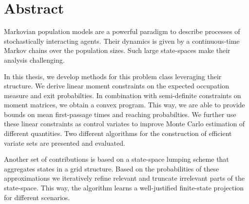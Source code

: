 
\chapter*{Abstract}
Markovian population models are a powerful paradigm to describe processes of stochastically interacting agents. Their dynamics is given by a continuous-time Markov chains over the population sizes. Such large state-spaces make their analysis challenging.

In this thesis, we develop methods for this problem class leveraging their structure. We derive linear moment constraints on the expected occupation measure and exit probabilties. In combination with semi-definite constraints on moment matrices, we obtain a convex program. This way, we are able to provide bounds on mean first-passage times and reaching probabilties. We further use these linear constraints as control variates to improve Monte Carlo estimation of different quantities. Two different algorithms for the construction of efficient variate sets are presented and evaluated.

Another set of contributions is based on a state-space lumping scheme that aggregates states in a grid structure. Based on the probabilities of these approximations we iteratively refine relevant and truncate irrelevant parts of the state-space. This way, the algorithm learns a well-justified finite-state projection for different scenarios.

\cleardoublepage

